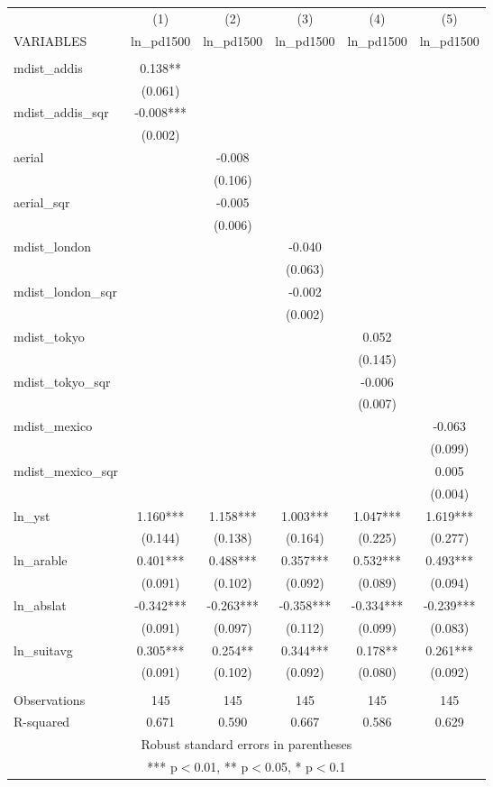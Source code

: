 \documentclass[]{article}
\begin{document}
\begin{tabular}{lccccc} \hline
 & (1) & (2) & (3) & (4) & (5) \\
VARIABLES & ln\_pd1500 & ln\_pd1500 & ln\_pd1500 & ln\_pd1500 & ln\_pd1500 \\ \hline
 &  &  &  &  &  \\
mdist\_addis & 0.138** &  &  &  &  \\
 & (0.061) &  &  &  &  \\
mdist\_addis\_sqr & -0.008*** &  &  &  &  \\
 & (0.002) &  &  &  &  \\
aerial &  & -0.008 &  &  &  \\
 &  & (0.106) &  &  &  \\
aerial\_sqr &  & -0.005 &  &  &  \\
 &  & (0.006) &  &  &  \\
mdist\_london &  &  & -0.040 &  &  \\
 &  &  & (0.063) &  &  \\
mdist\_london\_sqr &  &  & -0.002 &  &  \\
 &  &  & (0.002) &  &  \\
mdist\_tokyo &  &  &  & 0.052 &  \\
 &  &  &  & (0.145) &  \\
mdist\_tokyo\_sqr &  &  &  & -0.006 &  \\
 &  &  &  & (0.007) &  \\
mdist\_mexico &  &  &  &  & -0.063 \\
 &  &  &  &  & (0.099) \\
mdist\_mexico\_sqr &  &  &  &  & 0.005 \\
 &  &  &  &  & (0.004) \\
ln\_yst & 1.160*** & 1.158*** & 1.003*** & 1.047*** & 1.619*** \\
 & (0.144) & (0.138) & (0.164) & (0.225) & (0.277) \\
ln\_arable & 0.401*** & 0.488*** & 0.357*** & 0.532*** & 0.493*** \\
 & (0.091) & (0.102) & (0.092) & (0.089) & (0.094) \\
ln\_abslat & -0.342*** & -0.263*** & -0.358*** & -0.334*** & -0.239*** \\
 & (0.091) & (0.097) & (0.112) & (0.099) & (0.083) \\
ln\_suitavg & 0.305*** & 0.254** & 0.344*** & 0.178** & 0.261*** \\
 & (0.091) & (0.102) & (0.092) & (0.080) & (0.092) \\
 &  &  &  &  &  \\
Observations & 145 & 145 & 145 & 145 & 145 \\
 R-squared & 0.671 & 0.590 & 0.667 & 0.586 & 0.629 \\ \hline
\multicolumn{6}{c}{ Robust standard errors in parentheses} \\
\multicolumn{6}{c}{ *** p$<$0.01, ** p$<$0.05, * p$<$0.1} \\
\end{tabular}
\end{document}
